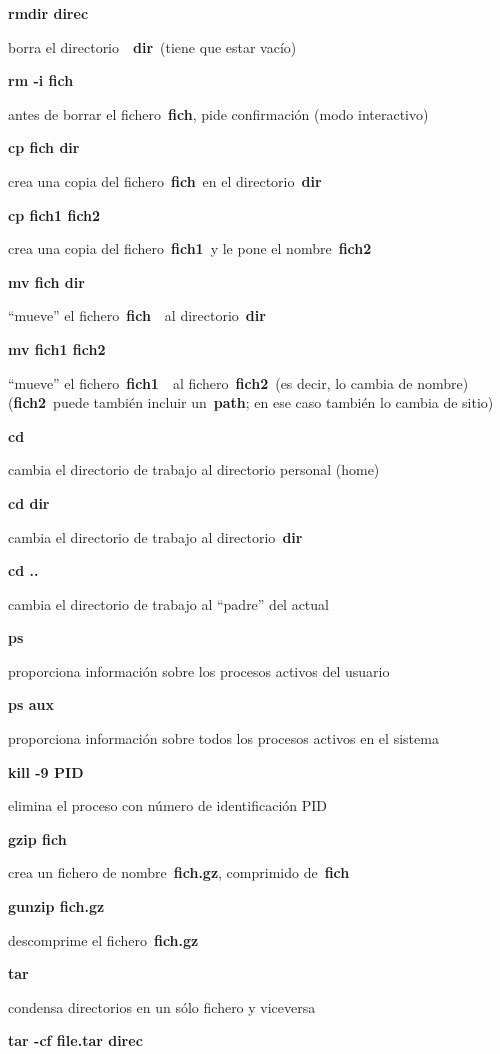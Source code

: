 \documentclass[
  jou,
  floatsintext,
  longtable,
  a4paper,
  nolmodern,
  notxfonts,
  notimes,
  12pt,
  colorlinks=true,linkcolor=blue,citecolor=blue,urlcolor=blue]{apa7}
\begin{document}
\textbf{rmdir direc}

borra el directorio~~\textbf{dir}~(tiene que estar vacío)

\textbf{rm -i fich}

antes de borrar el fichero~\textbf{fich}, pide confirmación (modo
interactivo)

\textbf{cp fich dir}

crea una copia del fichero~\textbf{fich}~en el directorio~\textbf{dir}

\textbf{cp fich1 fich2}

crea una copia del fichero~\textbf{fich1}~y le pone el
nombre~\textbf{fich2}

\textbf{mv fich dir}

``mueve'' el fichero~\textbf{fich}~~al directorio~\textbf{dir}

\textbf{mv fich1 fich2}

``mueve'' el fichero~\textbf{fich1}~~al fichero~\textbf{fich2}~(es
decir, lo cambia de nombre) (\textbf{fich2}~puede también incluir
un~\textbf{path}; en ese caso también lo cambia de sitio)

\textbf{cd}

cambia el directorio de trabajo al directorio personal (home)

\textbf{cd dir}

cambia el directorio de trabajo al directorio~\textbf{dir}

\textbf{cd ..}

cambia el directorio de trabajo al ``padre'' del actual

\textbf{ps}

proporciona información sobre los procesos activos del usuario

\textbf{ps aux}

proporciona información sobre todos los procesos activos en el sistema

\textbf{kill -9 PID}

elimina el proceso con número de identificación PID

\textbf{gzip fich}

crea un fichero de nombre~\textbf{fich.gz}, comprimido de~\textbf{fich}

\textbf{gunzip fich.gz}

descomprime el fichero~\textbf{fich.gz}

\textbf{tar}

condensa directorios en un sólo fichero y viceversa

\textbf{tar -cf file.tar direc}
\end{document}

